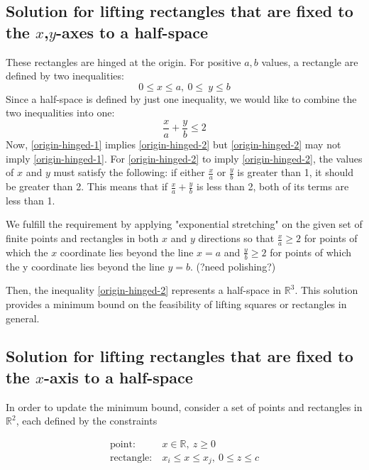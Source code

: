 \documentclass{NSF}
\begin{document}
\subsection{Solution for lifting rectangles that are fixed to the $x$,$y$-axes to a half-space}
These rectangles are hinged at the origin. For positive $a,b$ values, a rectangle are defined by two inequalities: 
\begin{equation}\label{origin-hinged-1}
0 \leq x \leq a,\  0\leq \  y \leq b
\end{equation}
Since a half-space is defined by just one inequality, we would like to combine the two inequalities into one: 
\begin{equation}\label{origin-hinged-2}
\frac{x}{a} + \frac{y}{b} \leq 2
\end{equation}
Now, \eqref{origin-hinged-1} implies \eqref{origin-hinged-2} but \eqref{origin-hinged-2}  may not imply \eqref{origin-hinged-1}. For \eqref{origin-hinged-2} to imply \eqref{origin-hinged-2}, the values of $x$ and $y$ must satisfy the following: if either $\frac{x}{a}$ or $\frac{y}{b}$ is greater than 1, it should be greater than 2. This means that if $\frac{x}{a}+\frac{y}{b}$  is less than 2, both of its terms are less than 1.

We fulfill the requirement by applying "exponential stretching" on the given set of finite points and rectangles in both $x$ and $y$ directions so that $\frac{x}{a} \geq 2$  for points of which the $x$ coordinate lies beyond the line $x=a$ and $\frac{y}{b} \geq 2$ for points of which the y coordinate lies beyond the line $y=b$.  (?need polishing?)

Then, the inequality \eqref{origin-hinged-2} represents a half-space in $\mathbb{R}^3$. This solution provides a minimum bound on the feasibility of lifting squares or rectangles in general.



\subsection{Solution for lifting rectangles that are fixed to the $x$-axis to a half-space }
In order to update the minimum bound, consider a set of points and rectangles in $\mathbb{R}^2$, each defined by the constraints

\begin{align*}
    \text{point:}& \ x \in \mathbb{R},\  z \geq 0 \\
    \text{rectangle:}& \ x_i \leq x \leq x_j,\ 0 \leq z \leq c
\end{align*}
\end{document}
